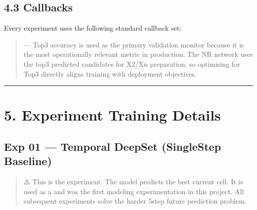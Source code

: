 \documentclass[letterpaper,10pt,english]{sphinxmanual}
\begin{document}
\subsection{4.3 Callbacks}
\label{\detokenize{training:callbacks}}
\sphinxAtStartPar
Every experiment uses the following standard callback set:

\begin{sphinxVerbatim}[commandchars=\\\{\}]
                    
\end{sphinxVerbatim}
\begin{quote}

\sphinxAtStartPar
{} — Top\sphinxhyphen{}3 accuracy is used as the primary validation monitor because it is the most operationally relevant metric in production. The NR network uses the top\sphinxhyphen{}3 predicted candidates for X2/Xn preparation, so optimising for Top\sphinxhyphen{}3 directly aligns training with deployment objectives.
\end{quote}


\bigskip\hrule\bigskip



\section{5. Experiment Training Details}
\label{\detokenize{training:experiment-training-details}}

\subsection{Exp 01 — Temporal DeepSet (Single\sphinxhyphen{}Step Baseline)}
\label{\detokenize{training:exp-01-temporal-deepset-single-step-baseline}}\begin{quote}

\sphinxAtStartPar
⚠️ This is the  experiment. The model predicts the best current cell. It is used as a  and was the first modeling experimentation in this project. All subsequent experiments solve the harder 5\sphinxhyphen{}step future prediction problem.
\end{quote}
\end{document}
